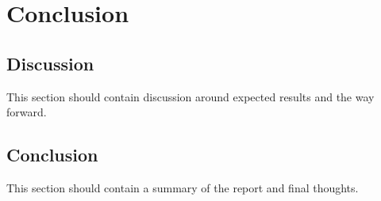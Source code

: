 \chapter{Conclusion} %

\label{Chapter4}



\section{Discussion}

This section should contain discussion around expected results and the way forward.


\section{Conclusion}

This section should contain a summary of the report and final thoughts.
